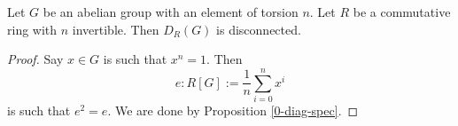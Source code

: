 \begin{proposition}
  \label{0-diag-tors}

  Let $G$ be an abelian group with an element of torsion $n$.
  Let $R$ be a commutative ring with $n$ invertible.
  Then $D_R(G)$ is disconnected.
\end{proposition}
\begin{proof}

  Say $x \in G$ is such that $x^n = 1$. Then
  \[e : R[G] := \frac 1n \sum_{i = 0}^n x^i\]
  is such that $e ^ 2 = e$.
  We are done by Proposition \ref{0-diag-spec}.
\end{proof}
